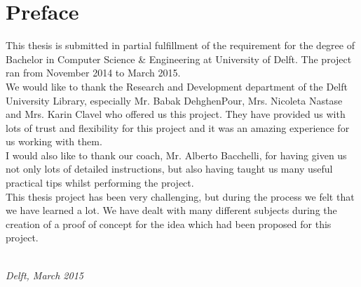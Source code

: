 \chapter*{Preface}

This thesis is submitted in partial fulfillment of the requirement for the degree of Bachelor in Computer Science \& Engineering at University of Delft. 
The project ran from November 2014 to March 2015.\\

We would like to thank the Research and Development department of the Delft University Library, especially Mr. Babak DehghenPour, Mrs. Nicoleta Nastase 
and Mrs. Karin Clavel who offered us this project. They have provided us with lots of trust and flexibility for this project and it was an amazing 
experience for us working with them.\\

I would also like to thank our coach, Mr. Alberto Bacchelli, for having given us not only lots of detailed instructions, but also having taught us many
useful practical tips whilst performing the project.\\

This thesis project has been very challenging, but during the process we felt that we have learned a lot. We have dealt with many different subjects 
during the creation of a proof of concept for the idea which had been proposed for this project.  


\begin{flushright}
{\makeatletter\itshape
    \@author \\
    Delft, March 2015
\makeatother}
\end{flushright}

